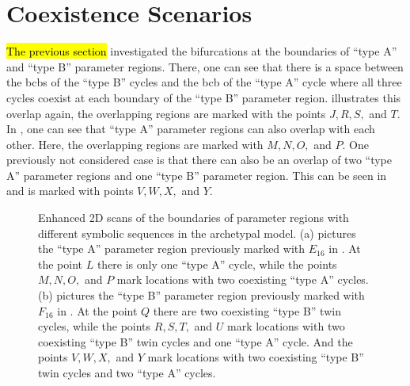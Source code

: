 \section{Coexistence Scenarios}
\label{sec:arch.coex}

\hl{The previous section} investigated the bifurcations at the boundaries of ``type A'' and ``type B'' parameter regions.
There, one can see that there is a space between the \glspl{bcb} of the ``type B'' cycles and the \gls{bcb} of the ``type A'' cycle where all three cycles coexist at each boundary of the ``type B'' parameter region.
 illustrates this overlap again, the overlapping regions are marked with the points $J, R, S,$ and $T$.
In , one can see that ``type A'' parameter regions can also overlap with each other.
Here, the overlapping regions are marked with $M, N, O,$ and $P$.
One previously not considered case is that there can also be an overlap of two ``type A'' parameter regions and one ``type B'' parameter region.
This can be seen in  and is marked with points $V, W, X,$ and $Y$.

\begin{figure}
	\centering
	\caption[Enhanced 2D scans of the boundaries of parameter regions with different symbolic sequences in the archetypal model]{
		Enhanced 2D scans of the boundaries of parameter regions with different symbolic sequences in the archetypal model.
		(a) pictures the ``type A'' parameter region previously marked with $E_{16}$ in .
		At the point $L$ there is only one ``type A'' cycle, while the points $M, N, O,$ and $P$ mark locations with two coexisting ``type A'' cycles.
		(b) pictures the ``type B'' parameter region previously marked with $F_{16}$ in .
		At the point $Q$ there are two coexisting ``type B'' twin cycles, while the points $R, S, T,$ and $U$ mark locations with two coexisting ``type B'' twin cycles and one ``type A'' cycle.
		And the points $V, W, X,$ and $Y$ mark locations with two coexisting ``type B'' twin cycles and two ``type A'' cycles.
	}
	\label{fig:arch.coex.regions}
\end{figure}

